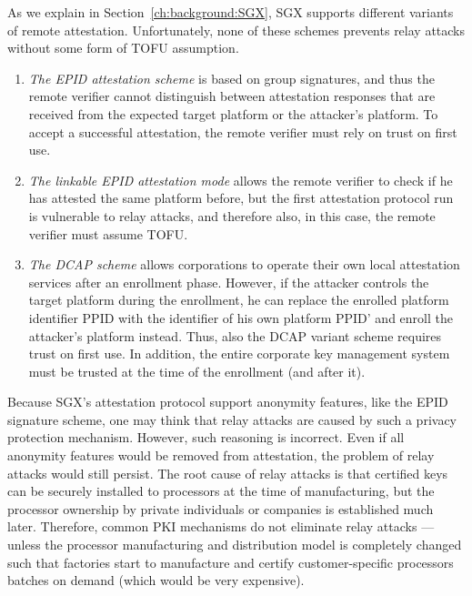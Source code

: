 As we explain in Section~\ref{ch:background:SGX}, SGX supports different variants of remote attestation. Unfortunately, none of these schemes prevents relay attacks without some form of TOFU assumption.

\begin{enumerate}
	\item \emph{The EPID attestation scheme} is based on group signatures, and thus the remote verifier cannot distinguish between attestation responses that are received from the expected target platform or the attacker's platform. To accept a successful attestation, the remote verifier must rely on trust on first use. 

	\item \emph{The linkable EPID attestation mode} allows the remote verifier to check if he has attested the same platform before, but the first attestation protocol run is vulnerable to relay attacks, and therefore also, in this case, the remote verifier must assume TOFU. 

	\item \emph{The DCAP scheme} allows corporations to operate their own local attestation services after an enrollment phase. However, if the attacker controls the target platform during the enrollment, he can replace the enrolled platform identifier PPID with the identifier of his own platform PPID' and enroll the attacker's platform instead. Thus, also the DCAP variant scheme requires trust on first use. In addition, the entire corporate key management system must be trusted at the time of the enrollment (and after it).
\end{enumerate}


Because SGX's attestation protocol support anonymity features, like the EPID signature scheme, one may think that relay attacks are caused by such a privacy protection mechanism. However, such reasoning is incorrect. Even if all anonymity features would be removed from attestation, the problem of relay attacks would still persist. The root cause of relay attacks is that certified keys can be securely installed to processors at the time of manufacturing, but the processor ownership by private individuals or companies is established much later. Therefore, common PKI mechanisms do not eliminate relay attacks --- unless the processor manufacturing and distribution model is completely changed such that factories start to manufacture and certify customer-specific processors batches on demand (which would be very expensive).


